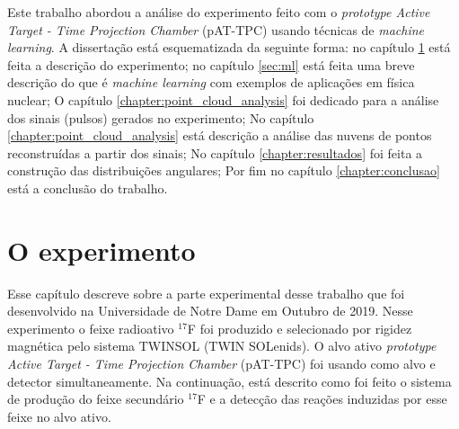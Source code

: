 \documentclass[a4paper,12pt,oneside]{book}
\begin{document}
\par Este trabalho abordou a análise do experimento feito com o \textit{prototype Active Target - Time Projection Chamber} (pAT-TPC) \cite{pattpc} usando técnicas de \textit{machine learning}. A dissertação está esquematizada da seguinte forma: no capítulo \ref{PATTPC} está feita a descrição do experimento; no capítulo \ref{sec:ml} está feita uma breve descrição do que é \textit{machine learning} com exemplos de aplicações em física nuclear; O capítulo \ref{chapter:point_cloud_analysis} foi dedicado para a análise dos sinais (pulsos) gerados no experimento; No capítulo \ref{chapter:point_cloud_analysis} está descrição a análise das nuvens de pontos reconstruídas a partir dos sinais; No capítulo \ref{chapter:resultados} foi feita a construção das distribuições angulares; Por fim no capítulo \ref{chapter:conclusao} está a conclusão do trabalho.

\chapter{O experimento}\label{PATTPC}

\par Esse capítulo descreve sobre a parte experimental desse trabalho que foi desenvolvido na Universidade de Notre Dame em Outubro de 2019. Nesse experimento o feixe radioativo $^{17}$F foi produzido e selecionado por rigidez magnética pelo sistema TWINSOL (TWIN SOLenids)\cite{twinsol}. O alvo ativo \textit{prototype Active Target - Time Projection Chamber} (pAT-TPC) \cite{pattpc} foi usando como alvo e detector simultaneamente. Na continuação, está descrito como foi feito o sistema de produção do feixe secundário $^{17}$F e a detecção das reações induzidas por esse feixe no alvo ativo.




\end{document}
